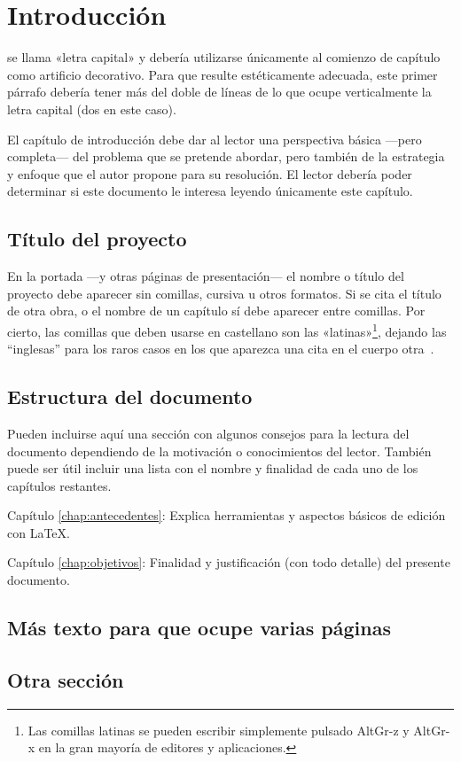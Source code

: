 \chapter{Introducción}

 se llama «letra capital» y debería utilizarse únicamente al
comienzo de capítulo como artificio decorativo. Para que resulte estéticamente
adecuada, este primer párrafo debería tener más del doble de líneas de lo que
ocupe verticalmente la letra capital (dos en este caso).

El capítulo de introducción debe dar al lector una perspectiva básica ---pero
completa--- del problema que se pretende abordar, pero también de la estrategia
y enfoque que el autor propone para su resolución. El lector debería poder
determinar si este documento le interesa leyendo únicamente este capítulo.


\section{Título del proyecto}

En la portada ---y otras páginas de presentación--- el nombre o título del
proyecto debe aparecer sin comillas, cursiva u otros formatos. Si se cita el
título de otra obra, o el nombre de un capítulo sí debe aparecer entre
comillas. Por cierto, las comillas que deben usarse en castellano son las
«latinas»\footnote{Las comillas latinas se pueden escribir simplemente pulsado
  AltGr-z y AltGr-x en la gran mayoría de editores y aplicaciones.}, dejando las
``inglesas'' para los raros casos en los que aparezca una cita en el cuerpo
otra~\cite{sousa}.


\section{Estructura del documento}

Pueden incluirse aquí una sección con algunos consejos para la lectura del
documento dependiendo de la motivación o conocimientos del lector.  También
puede ser útil incluir una lista con el nombre y finalidad de cada uno de los
capítulos restantes.

\begin{definitionlist}
\item[Capítulo \ref{chap:antecedentes}: \nameref{chap:antecedentes}] Explica herramientas
  y aspectos básicos de edición con \LaTeX.
\item[Capítulo \ref{chap:objetivos}: \nameref{chap:objetivos}] Finalidad y justificación
  (con todo detalle) del presente documento.
\end{definitionlist}


\section{Más texto para que ocupe varias páginas}

\textcolor{blue}{
  \blindtext
  \blinditemize[4]
  \blindmathpaper
}

\section{Otra sección}

\textcolor{blue}{
  \blindtext
}


